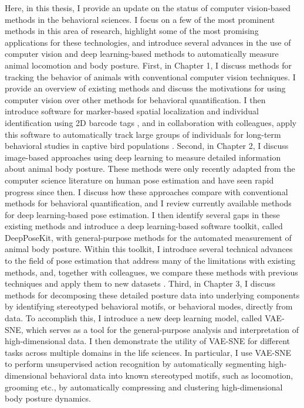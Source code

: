 \documentclass[11pt,a4paper,twoside]{book}
\begin{document}
\begin{doublespace}
Here, in this thesis, I provide an update on the status of computer vision-based methods in the behavioral sciences. I focus on a few of the most prominent methods in this area of research, highlight some of the most promising applications for these technologies, and introduce several advances in the use of computer vision and deep learning-based methods to automatically measure animal locomotion and body posture. First, in Chapter 1, I discuss methods for tracking the behavior of animals with conventional computer vision techniques. I provide an overview of existing methods and discuss the motivations for using computer vision over other methods for behavioral quantification. I then introduce software for marker-based spatial localization and individual identification using 2D barcode tags \citep{graving2017pinpoint}, and in collaboration with colleagues, apply this software to automatically track large groups of individuals for long-term behavioral studies in captive bird populations \citep{alarcon2018automated}. Second, in Chapter 2, I discuss image-based approaches using deep learning to measure detailed information about animal body posture. These methods were only recently adapted from the computer science literature on human pose estimation and have seen rapid progress since then. I discuss how these approaches compare with conventional methods for behavioral quantification, and I review currently available methods for deep learning-based pose estimation. I then identify several gaps in these existing methods and introduce a deep learning-based software toolkit, called DeepPoseKit, with general-purpose methods for the automated measurement of animal body posture. Within this toolkit, I introduce several technical advances to the field of pose estimation that address many of the limitations with existing methods, and, together with colleagues, we compare these methods with previous techniques and apply them to new datasets \citep{graving2019deepposekit}. Third, in Chapter 3, I discuss methods for decomposing these detailed posture data into underlying components by identifying stereotyped behavioral motifs, or behavioral modes, directly from data. To accomplish this, I introduce a new deep learning model, called VAE-SNE, which serves as a tool for the general-purpose analysis and interpretation of high-dimensional data. I then demonstrate the utility of VAE-SNE for different tasks across multiple domains in the life sciences. In particular, I use VAE-SNE to perform unsupervised action recognition by automatically segmenting high-dimensional behavioral data into known stereotyped motifs, such as locomotion, grooming etc., by automatically compressing and clustering high-dimensional body posture dynamics. 


\end{doublespace}
\end{document}

